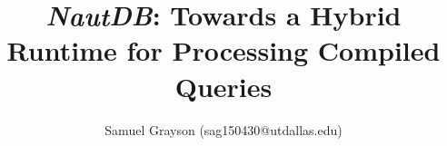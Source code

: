 \documentclass[final,14pt]{beamer}
\title{\emph{NautDB}: Towards a Hybrid Runtime for Processing Compiled Queries}
\author{Samuel Grayson (sag150430@utdallas.edu)}
\institute{University of Texas at Dallas}
\newlength{\sepwid}
\newlength{\onecolwid}
\begin{document}
\begin{frame}[t] %

  \begin{columns}[t]

    \begin{column}{\sepwid}
    \end{column}

    \begin{column}{\onecolwid}
      
      
      
    \end{column}

    \begin{column}{\sepwid}
    \end{column}

    \begin{column}{\onecolwid}
      
      
      
    \end{column}

    \begin{column}{\sepwid}
    \end{column}

    \begin{column}{\onecolwid}
      \vspace{-1cm}
      
    \end{column}

    \begin{column}{\sepwid}
    \end{column}

    \begin{column}{\onecolwid}
      
      
      
      
    \end{column}

    \begin{column}{\sepwid}
    \end{column}
  \end{columns}
  
\end{frame}
\end{document}
